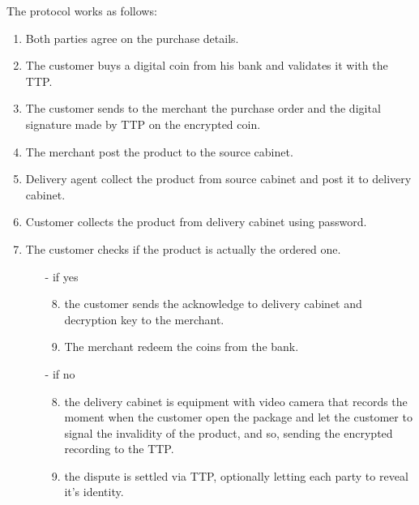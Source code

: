 \documentclass{article}
\begin{document}
The protocol works as follows:
\begingroup
\renewcommand{\labelenumii}{\arabic{enumii}.}
\begin{enumerate}
\item Both parties agree on the purchase details.
\item The customer buys a digital coin from his bank and validates it with the TTP.
\item The customer sends to the merchant the purchase order and the digital signature made by TTP on the encrypted coin.
\item The merchant post the product to the source cabinet.
\item Delivery agent collect the product from source cabinet and post it to delivery cabinet.
\item Customer collects the product from delivery cabinet using password.
\item The customer checks if the product is actually the ordered one.
\begin{itemize}
\item[-] if yes
\begin{enumerate}
\setcounter{enumii}{7}
\item the customer sends the acknowledge to delivery cabinet and decryption key to the merchant.
\item The merchant redeem the coins from the bank.
\end{enumerate}
\item[-] if no
\begin{enumerate}
\setcounter{enumii}{7}
\item the delivery cabinet is equipment with video camera that records the moment when the customer open the package and let the customer to signal the invalidity of the product, and so, sending the encrypted recording to the TTP.
\item the dispute is settled via TTP, optionally letting each party to reveal it's identity.
\end{enumerate}
\end{itemize}
\end{enumerate}
\endgroup
\end{document}
